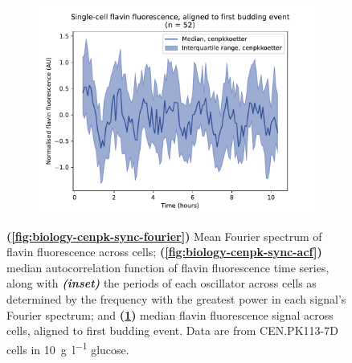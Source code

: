\begin{figure}
  \begin{subfigure}[htpb]{0.45\textwidth}
   \centering
   \includegraphics[width=\textwidth]{cenpkkoetter_20212_6.pdf}
   \caption{
   }
   \label{fig:biology-cenpk-sync-median}
  \end{subfigure}

  \caption{
    \textbf{(\ref{fig:biology-cenpk-sync-fourier})} Mean Fourier spectrum of flavin fluorescence across cells; \textbf{(\ref{fig:biology-cenpk-sync-acf})} median autocorrelation function of flavin fluorescence time series, along with \textit{\textbf{(inset)}} the periods of each oscillator across cells as determined by the frequency with the greatest power in each signal's Fourier spectrum; and
    \textbf{(\ref{fig:biology-cenpk-sync-median})}
    median flavin fluorescence signal across cells, aligned to first budding event.
    Data are from CEN.PK113-7D cells in \SI{10}{\gram~\litre^{-1}} glucose.
  }
  \label{fig:biology-cenpk-sync}
\end{figure}

